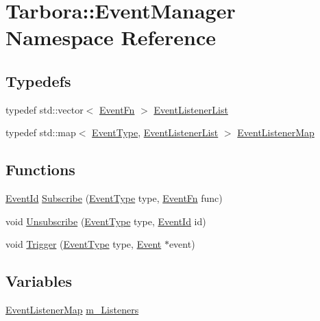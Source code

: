 \hypertarget{namespaceTarbora_1_1EventManager}{}\section{Tarbora\+:\+:Event\+Manager Namespace Reference}
\label{namespaceTarbora_1_1EventManager}
\subsection*{Typedefs}
\begin{DoxyCompactItemize}
\item 
typedef std\+::vector$<$ \hyperlink{namespaceTarbora_a418b0f026f0664511b2a0c4129edc11f}{Event\+Fn} $>$ \hyperlink{namespaceTarbora_1_1EventManager_af2a8ccc3af56c94f352b42f5efa966dd}{Event\+Listener\+List}
\item 
typedef std\+::map$<$ \hyperlink{namespaceTarbora_a70bd9c4d542b943fff3793f78189967e}{Event\+Type}, \hyperlink{namespaceTarbora_1_1EventManager_af2a8ccc3af56c94f352b42f5efa966dd}{Event\+Listener\+List} $>$ \hyperlink{namespaceTarbora_1_1EventManager_a9254759257c0dc7fd52908f87bfa68ec}{Event\+Listener\+Map}
\end{DoxyCompactItemize}
\subsection*{Functions}
\begin{DoxyCompactItemize}
\item 
\hyperlink{namespaceTarbora_a5373bb1f8a65622379828cdefc8d42e5}{Event\+Id} \hyperlink{namespaceTarbora_1_1EventManager_a7296edcf388f134db3dbf86787ce7040}{Subscribe} (\hyperlink{namespaceTarbora_a70bd9c4d542b943fff3793f78189967e}{Event\+Type} type, \hyperlink{namespaceTarbora_a418b0f026f0664511b2a0c4129edc11f}{Event\+Fn} func)
\item 
void \hyperlink{namespaceTarbora_1_1EventManager_ab1d0fc452783db5cfb1b5d962f408482}{Unsubscribe} (\hyperlink{namespaceTarbora_a70bd9c4d542b943fff3793f78189967e}{Event\+Type} type, \hyperlink{namespaceTarbora_a5373bb1f8a65622379828cdefc8d42e5}{Event\+Id} id)
\item 
void \hyperlink{namespaceTarbora_1_1EventManager_a9ac99b33a5dd3509625ac20520d722ab}{Trigger} (\hyperlink{namespaceTarbora_a70bd9c4d542b943fff3793f78189967e}{Event\+Type} type, \hyperlink{structTarbora_1_1Event}{Event} $\ast$event)
\end{DoxyCompactItemize}
\subsection*{Variables}
\begin{DoxyCompactItemize}
\item 
\hyperlink{namespaceTarbora_1_1EventManager_a9254759257c0dc7fd52908f87bfa68ec}{Event\+Listener\+Map} \hyperlink{namespaceTarbora_1_1EventManager_af82d09c8ed322ff016f5b88bc955a6df}{m\+\_\+\+Listeners}
\end{DoxyCompactItemize}


